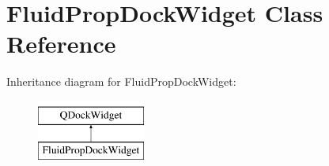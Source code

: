 \hypertarget{class_fluid_prop_dock_widget}{\section{Fluid\-Prop\-Dock\-Widget Class Reference}
\label{class_fluid_prop_dock_widget}
}
Inheritance diagram for Fluid\-Prop\-Dock\-Widget\-:\begin{figure}[H]
\begin{center}
\leavevmode
\includegraphics[height=2.000000cm]{class_fluid_prop_dock_widget}
\end{center}
\end{figure}
